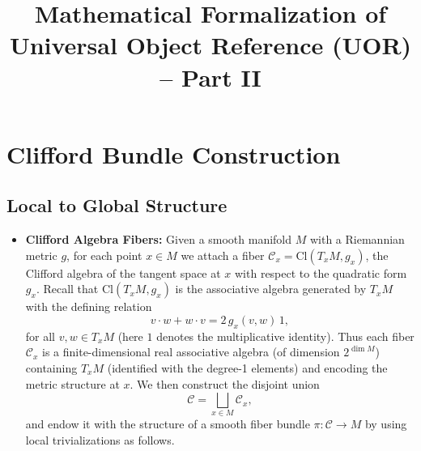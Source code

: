 \documentclass[12pt]{article}
\title{Mathematical Formalization of Universal Object Reference (UOR) -- Part II}
\author{}
\date{}
\begin{document}
\maketitle

\section{Clifford Bundle Construction}

\subsection{Local to Global Structure}
\begin{itemize}
    \item \textbf{Clifford Algebra Fibers:} Given a smooth manifold $M$ with a Riemannian metric $g$, for each point $x \in M$ we attach a fiber $\mathcal{C}_x = \mathrm{Cl}(T_x M, g_x)$, the Clifford algebra of the tangent space at $x$ with respect to the quadratic form $g_x$.  Recall that $\mathrm{Cl}(T_x M, g_x)$ is the associative algebra generated by $T_x M$ with the defining relation 
    \[
       v \cdot w + w \cdot v = 2\,g_x(v,w)\,1,
    \] 
    for all $v,w\in T_x M$ (here $1$ denotes the multiplicative identity). Thus each fiber $\mathcal{C}_x$ is a finite-dimensional real associative algebra (of dimension $2^{\dim M}$) containing $T_x M$ (identified with the degree-1 elements) and encoding the metric structure at $x$. We then construct the disjoint union 
    \[
       \mathcal{C} = \bigsqcup_{x \in M} \mathcal{C}_x,
    \] 
    and endow it with the structure of a smooth fiber bundle $\pi: \mathcal{C} \to M$ by using local trivializations as follows.


\end{itemize}
\end{document}
